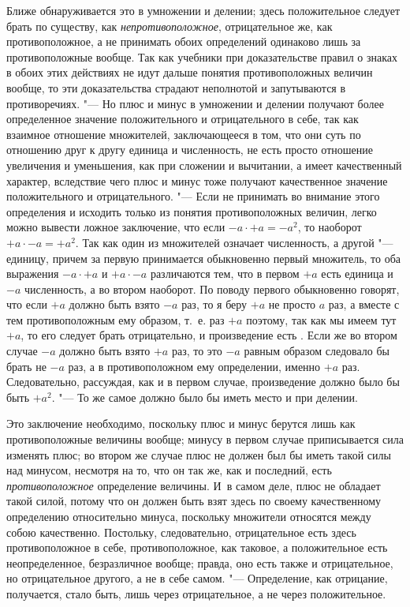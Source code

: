 Ближе обнаруживается это в умножении и делении; здесь положительное следует
брать по существу, как {\em непротивоположное},
отрицательное же, как противоположное, а не принимать обоих определений
одинаково лишь за противоположные вообще. Так как учебники при
доказательстве правил о знаках в обоих этих действиях не идут дальше
понятия противоположных величин вообще, то эти доказательства страдают
неполнотой и запутываются в противоречиях. "--- Но плюс и минус в умножении и
делении получают более определенное значение положительного и
отрицательного в себе, так как взаимное отношение множителей, заключающееся
в том, что они суть по отношению друг к другу единица и численность, не
есть просто отношение увеличения и уменьшения, как при сложении и
вычитании, а имеет качественный характер, вследствие чего плюс и минус тоже
получают качественное значение положительного и отрицательного. "--- Если не
принимать во внимание этого определения и исходить только из понятия
противоположных величин, легко можно вывести ложное заключение, что если
$-a\cdot+a=-a^2$, то наоборот $+a\cdot-a=+a^2$. Так как один из множителей
означает численность, а другой "--- единицу, причем за первую принимается
обыкновенно первый множитель,
то оба выражения $-a\cdot+a$ и $+a\cdot-a$ различаются тем,
что в первом $+a$ есть единица и $-a$ численность, а во втором наоборот.
По поводу первого обыкновенно говорят, что если $+a$ должно
быть взято $-a$ раз, то я беру $+a$ не просто $a$ раз, а
вместе с тем противоположным ему образом, т.~е. раз $+a$
поэтому, так как мы имеем тут {\em $+a$}, то его следует
брать отрицательно, и произведение есть . Если же во втором случае
$-a$ должно быть взято $+a$ раз, то это $-a$
равным образом следовало бы брать не $-a$ раз, а в
противоположном ему определении, именно $+a$ раз.
Следовательно, рассуждая, как и в первом случае, произведение должно было
бы быть $+a^2$. "--- То же самое должно было бы иметь место и при делении.

Это заключение необходимо, поскольку плюс и минус берутся лишь как
противоположные величины вообще; минусу в первом случае приписывается сила
изменять плюс; во втором же случае плюс не должен был бы иметь такой силы
над минусом, несмотря на то, что он так же, как и последний, есть
{\em противоположное} определение величины. И~в самом
деле, плюс не обладает такой силой, потому что он должен быть взят здесь по
своему качественному определению относительно минуса, поскольку множители
относятся между собою качественно. Постольку, следовательно, отрицательное
есть здесь противоположное в себе, противоположное, как таковое, а
положительное есть неопределенное, безразличное вообще; правда, оно есть
также и отрицательное, но отрицательное другого, а не в себе самом. "---
Определение, как отрицание, получается, стало быть, лишь через
отрицательное, а не через положительное.

